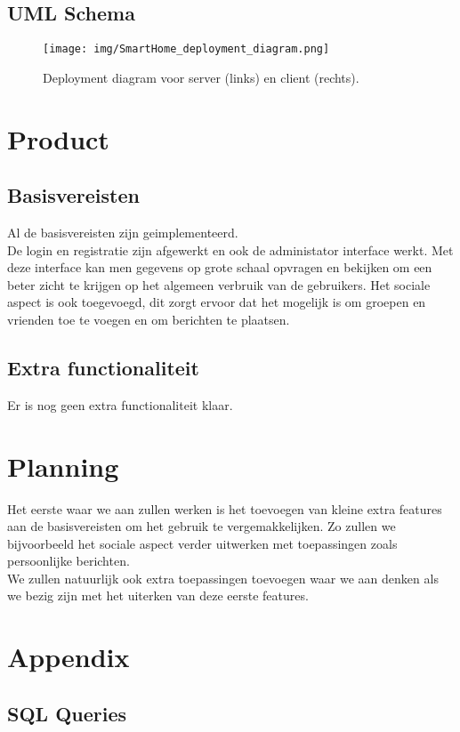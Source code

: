 \documentclass[11pt]{article}
\begin{document}
  \subsection{UML Schema}
  \begin{figure}[H]
  \centering
    \texttt{[image: img/SmartHome\_deployment\_diagram.png]}
  \caption{Deployment diagram voor server (links) en client (rechts).}
  \label{fig:uml}
  \end{figure}
\section{Product}
  \subsection{Basisvereisten}
  Al de basisvereisten zijn geimplementeerd.\\
  De login en registratie zijn afgewerkt en ook de administator interface werkt. Met deze interface
  kan men gegevens op grote schaal opvragen en bekijken om een beter zicht te krijgen op het
  algemeen verbruik van de gebruikers. Het sociale aspect is ook toegevoegd, dit zorgt ervoor dat
  het mogelijk is om groepen en vrienden toe te voegen en om berichten te plaatsen.
  \subsection{Extra functionaliteit}
  Er is nog geen extra functionaliteit klaar.
\section{Planning}
Het eerste waar we aan zullen werken is het toevoegen van kleine extra features aan de
basisvereisten om het gebruik te vergemakkelijken. Zo zullen we bijvoorbeeld het sociale aspect
verder uitwerken met toepassingen zoals persoonlijke berichten.\\
We zullen natuurlijk ook extra toepassingen toevoegen waar we aan denken als we bezig zijn
met het uiterken van deze eerste features.
\section{Appendix}
  \subsection{SQL Queries}
\end{document}
